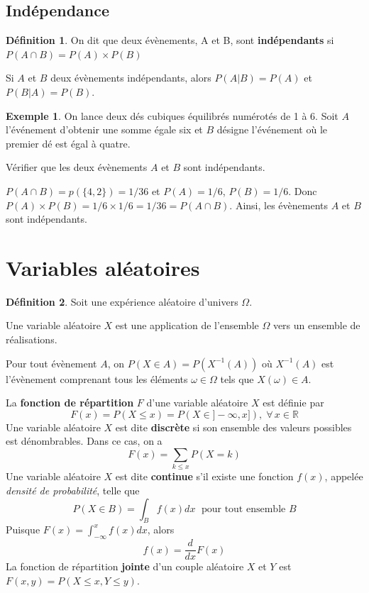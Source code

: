 \documentclass[
]{book}
\theoremstyle{definition}
\newtheorem{definition}{Définition}[chapter]
\theoremstyle{definition}
\newtheorem{example}{Exemple}[chapter]
\theoremstyle{definition}
\theoremstyle{remark}
\begin{document}
\hypertarget{induxe9pendance}{%
\subsection{Indépendance}\label{induxe9pendance}}

\begin{definition}
\protect\hypertarget{def:unnamed-chunk-7}{}{\label{def:unnamed-chunk-7} }On dit que deux évènements, A et B, sont \textbf{indépendants} si \(P(A\cap B)=P(A)\times P(B)\)
\end{definition}

Si \(A\) et \(B\) deux évènements indépendants, alors \(P(A|B)=P(A)\) et \(P(B|A)=P(B)\).

\begin{example}
\protect\hypertarget{exm:unnamed-chunk-8}{}{\label{exm:unnamed-chunk-8} }On lance deux dés cubiques équilibrés numérotés de 1 à 6. Soit \(A\) l'événement d'obtenir une somme égale six et \(B\) désigne l'événement où le premier dé est égal à quatre.

Vérifier que les deux évènements \(A\) et \(B\) sont indépendants.

\(P(A\cap B)=p(\{4,2 \})=1/36\) et \(P(A)=1/6\), \(P(B)=1/6\). Donc \(P(A)\times P(B)=1/6 \times 1/6 =1/36 =P(A\cap B)\). Ainsi, les évènements \(A\) et \(B\) sont indépendants.
\end{example}

\hypertarget{variables-aluxe9atoires}{%
\section{Variables aléatoires}\label{variables-aluxe9atoires}}

\begin{definition}
\protect\hypertarget{def:unnamed-chunk-9}{}{\label{def:unnamed-chunk-9} }Soit une expérience aléatoire d'univers \(\Omega\).

Une variable aléatoire \(X\) est une application de l'ensemble \(\Omega\) vers un ensemble de réalisations.

Pour tout évènement \(A\), on \(P(X \in A)=P(X^{-1}(A))\) où \(X^{-1}(A)\) est l'évènement comprenant tous les éléments \(\omega \in \Omega\) tels que \(X(\omega) \in A\).
\end{definition}

La \textbf{fonction de répartition} \(F\) d'une variable aléatoire \(X\) est définie par
\[
F(x)=P(X \leq x)=P(X \in ]-\infty, x]), \; \forall \, x \in \mathbb{R}
\]
Une variable aléatoire \(X\) est dite \textbf{discrète} si son ensemble des valeurs possibles est dénombrables. Dans ce cas, on a
\[
F(x)=\sum_{k \leq x }P(X=k)
\]
Une variable aléatoire \(X\) est dite \textbf{continue} s'il existe une fonction \(f(x)\), appelée \emph{densité de probabilité}, telle que
\[
P(X\in B)=\int_Bf(x)dx \; \text{ pour tout ensemble  }B
\]
Puisque \(F(x)=\displaystyle \int_{-\infty}^x f(x) dx\), alors
\[
f(x)=\frac{d}{dx}F(x)
\]
La fonction de répartition \textbf{jointe} d'un couple aléatoire \(X\) et \(Y\) est \(F(x,y)=P(X \leq x, Y \leq y)\).
\end{document}
